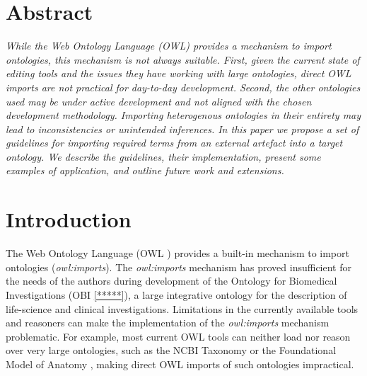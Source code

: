 \documentclass{elsart3p}    %
\begin{document}
\section*{Abstract}
\emph{
While the Web Ontology Language (OWL) provides a mechanism to import ontologies, this mechanism is not always suitable.
First, given the current state of editing tools and the issues they have working with large ontologies, direct OWL imports are not practical for day-to-day development.
Second, the other ontologies used may be under active development and not aligned with the chosen development methodology. Importing heterogenous ontologies in their entirety may lead to inconsistencies or unintended inferences.
In this paper we propose a set of guidelines for importing required terms from an external artefact into a target ontology.
We describe the guidelines, their implementation, present some examples of application, and outline future work and extensions.}




\section*{Introduction}
\label{intro}
The Web Ontology Language (OWL \cite{RefWorks:1506}) provides a built-in mechanism to import ontologies (\emph{owl:imports}).
The \emph{owl:imports} mechanism has proved insufficient for the needs of the authors during development of the Ontology for Biomedical Investigations (OBI \ref{*****}), a large integrative ontology for the description of life-science and clinical investigations.
Limitations in the currently available tools and reasoners can make the implementation of the \emph{owl:imports} mechanism problematic.
For example, most current OWL tools can neither load nor reason over very large ontologies, such as the NCBI Taxonomy \cite{RefWorks:1502} or the Foundational Model of Anatomy \cite{RefWorks:1558}, making direct OWL imports of such ontologies impractical.
\end{document}
